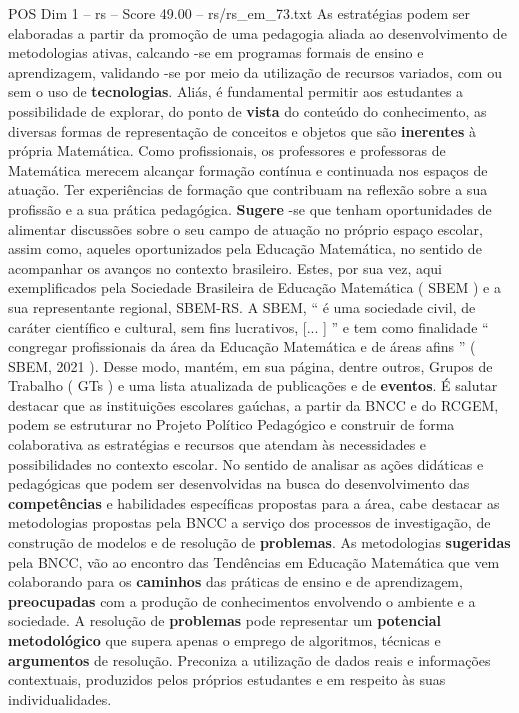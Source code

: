 \begin{textsample}{POS Dim 1 – rs – Score 49.00 – rs/rs\_em\_73.txt}
As estratégias podem ser elaboradas a partir da promoção de uma pedagogia aliada ao desenvolvimento de metodologias ativas, calcando -se em programas formais de ensino e aprendizagem, validando -se por meio da utilização de recursos variados, com ou sem o uso de \textbf{tecnologias}.
Aliás, é fundamental permitir aos estudantes a possibilidade de explorar, do ponto de \textbf{vista} do conteúdo do conhecimento, as diversas formas de representação de conceitos e objetos que são \textbf{inerentes} à própria Matemática.
Como profissionais, os professores e professoras de Matemática merecem alcançar formação contínua e continuada nos espaços de atuação.
Ter experiências de formação que contribuam na reflexão sobre a sua profissão e a sua prática pedagógica. \textbf{Sugere} -se que tenham oportunidades de alimentar discussões sobre o seu campo de atuação no próprio espaço escolar, assim como, aqueles oportunizados pela Educação Matemática, no sentido de acompanhar os avanços no contexto brasileiro.
Estes, por sua vez, aqui exemplificados pela Sociedade Brasileira de Educação Matemática ( SBEM ) e a sua representante regional, SBEM-RS.
A SBEM, “ é uma sociedade civil, de caráter científico e cultural, sem fins lucrativos, [... ] ” e tem como finalidade “ congregar profissionais da área da Educação Matemática e de áreas afins ” ( SBEM, 2021 ).
Desse modo, mantém, em sua página, dentre outros, Grupos de Trabalho ( GTs ) e uma lista atualizada de publicações e de \textbf{eventos}.
É salutar destacar que as instituições escolares gaúchas, a partir da BNCC e do RCGEM, podem se estruturar no Projeto Político Pedagógico e construir de forma colaborativa as estratégias e recursos que atendam às necessidades e possibilidades no contexto escolar.
No sentido de analisar as ações didáticas e pedagógicas que podem ser desenvolvidas na busca do desenvolvimento das \textbf{competências} e habilidades específicas propostas para a área, cabe destacar as metodologias propostas pela BNCC a serviço dos processos de investigação, de construção de modelos e de resolução de \textbf{problemas}.
As metodologias \textbf{sugeridas} pela BNCC, vão ao encontro das Tendências em Educação Matemática que vem colaborando para os \textbf{caminhos} das práticas de ensino e de aprendizagem, \textbf{preocupadas} com a produção de conhecimentos envolvendo o ambiente e a sociedade.
A resolução de \textbf{problemas} pode representar um \textbf{potencial} \textbf{metodológico} que supera apenas o emprego de algoritmos, técnicas e \textbf{argumentos} de resolução.
Preconiza a utilização de dados reais e informações contextuais, produzidos pelos próprios estudantes e em respeito às suas individualidades.

\end{textsample}
